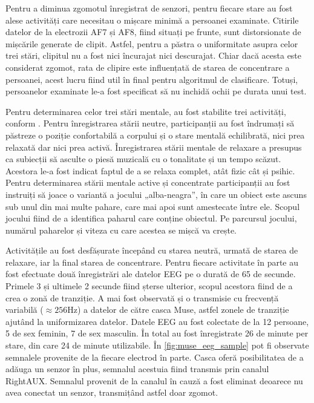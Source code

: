 Pentru a diminua zgomotul înregistrat de senzori, pentru fiecare stare au fost alese activități care necesitau o mișcare minimă a persoanei examinate. Citirile datelor de la electrozii AF7 și AF8, fiind situați pe frunte, sunt distorsionate de mișcările generate de clipit. Astfel, pentru a păstra o uniformitate asupra celor trei stări, clipitul nu a fost nici încurajat nici descurajat. Chiar dacă acesta este considerat zgomot, rata de clipire este influențată de starea de concentrare a persoanei, acest lucru fiind util în final pentru algoritmul de clasificare. Totuși, persoanelor examinate le-a fost specificat să nu inchidă ochii pe durata unui test.

Pentru determinarea celor trei stări mentale, au fost stabilite trei activități, conform \cite{eeg:2018}. Pentru înregistrarea stării neutre, participanții au fost îndrumați să păstreze o poziție confortabilă a corpului și o stare mentală echilibrată, nici prea relaxată dar nici prea activă. Înregistrarea stării mentale de relaxare a presupus ca subiecții să asculte o piesă muzicală cu o tonalitate și un tempo scăzut. Acestora le-a fost indicat faptul de a se relaxa complet, atât fizic cât și psihic. Pentru determinarea stării mentale active și concentrate participanții au fost instruiți să joace o variantă a jocului „alba-neagra”, în care un obiect este ascuns sub unul din mai multe pahare, care mai apoi sunt amestecate între ele. Scopul jocului fiind de a identifica paharul care conține obiectul. Pe parcursul jocului, numărul paharelor și viteza cu care acestea se mișcă va crește.

Activitățile au fost desfășurate începând cu starea neutră, urmată de starea de relaxare, iar la final starea de concentrare. Pentru fiecare activitate în parte au fost efectuate două înregistrări ale datelor EEG pe o durată de 65 de secunde. Primele 3 și ultimele 2 secunde fiind șterse ulterior, scopul acestora fiind de a crea o zonă de tranziție. A mai fost observată și o transmisie cu frecvență variabilă ($\approx256\si{\hertz}$) a datelor de către casca Muse, astfel zonele de tranziție ajutând la uniformizarea datelor. Datele EEG au fost colectate de la 12 persoane, 5 de sex feminin, 7 de sex masculin. În total au fost înregistrate 26 de minute per stare, din care 24 de minute utilizabile. În \autoref{fig:muse_eeg_sample} pot fi observate semnalele provenite de la fiecare electrod în parte. Casca oferă posibilitatea de a adăuga un senzor în plus, semnalul acestuia fiind transmis prin canalul RightAUX. Semnalul provenit de la canalul în cauză a fost eliminat deoarece nu avea conectat un senzor, transmițând astfel doar zgomot.

